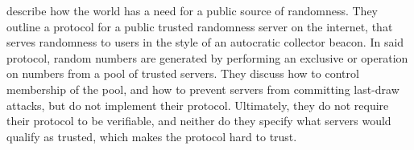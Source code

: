 \citet{fischer2011publicrandomnessservice} describe how the world has a need for a public source of randomness.
They outline a protocol for a public trusted randomness server on the internet, that serves randomness to users in the style of an autocratic collector beacon.
In said protocol, random numbers are generated by performing an exclusive or operation on numbers from a pool of trusted servers.
They discuss how to control membership of the pool, and how to prevent servers from committing last-draw attacks, but do not implement their protocol.
Ultimately, they do not require their protocol to be verifiable, and neither do they specify what servers would qualify as trusted, which makes the protocol hard to trust.
